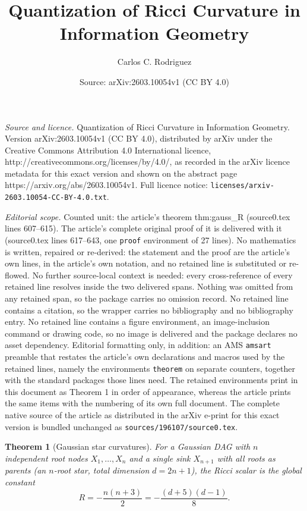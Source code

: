 \documentclass[10pt,a4paper]{amsart}
\title{Quantization of Ricci Curvature in Information Geometry}
\author{Carlos C. Rodriguez}
\date{Source: arXiv:2603.10054v1 (CC BY 4.0)}
\newtheorem{theorem}{Theorem}
\begin{document}
\maketitle

\noindent\emph{Source and licence.} Quantization of Ricci Curvature in Information Geometry. Version arXiv:2603.10054v1 (CC BY 4.0), distributed by arXiv under the Creative Commons Attribution 4.0 International licence, http://creativecommons.org/licenses/by/4.0/, as recorded in the arXiv licence metadata for this exact version and shown on the abstract page https://arxiv.org/abs/2603.10054v1. Full licence notice: \texttt{licenses/arxiv-2603.10054-CC-BY-4.0.txt}.\par\smallskip

\noindent\textit{Editorial scope.} Counted unit: the article's theorem thm:gauss\_R (source0.tex lines 607--615). The article's complete original proof of it is delivered with it (source0.tex lines 617--643, one \texttt{proof} environment of 27 lines). No mathematics is written, repaired or re-derived: the statement and the proof are the article's own lines, in the article's own notation, and no retained line is substituted or re-flowed.  No further source-local context is needed: every cross-reference of every retained line resolves inside the two delivered spans.  Nothing was omitted from any retained span, so the package carries no omission record.  No retained line contains a citation, so the wrapper carries no bibliography and no bibliography entry.  No retained line contains a figure environment, an image-inclusion command or drawing code, so no image is delivered and the package declares no asset dependency.  Editorial formatting only, in addition: an AMS \texttt{amsart} preamble that restates the article's own declarations and macros used by the retained lines, namely the environments \texttt{theorem} on separate counters, together with the standard packages those lines need.  The retained environments print in this document as Theorem 1 in order of appearance, whereas the article prints the same items with the numbering of its own full document.  The complete native source of the article as distributed in the arXiv e-print for this exact version is bundled unchanged as \texttt{sources/196107/source0.tex}.
\begin{theorem}[Gaussian star curvatures]\label{thm:gauss_R}
For a Gaussian DAG with $n$ independent root nodes $X_1,\ldots,X_n$ and 
a single sink $X_{n+1}$ with all roots as parents 
(an $n$-root star, total dimension $d = 2n+1$), the Ricci scalar is 
the global constant
\begin{equation}\label{eq:gauss_R_formula}
  R = -\frac{n(n+3)}{2} = -\frac{(d+5)(d-1)}{8}.
\end{equation}
\end{theorem}
\end{document}
